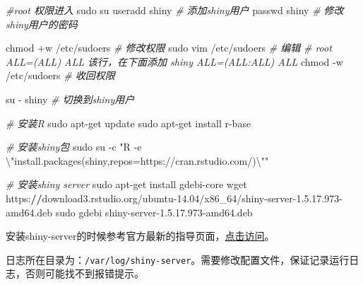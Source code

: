 \documentclass[
  10pt,
]{book}
\newenvironment{Shaded}{\begin{snugshade}}{\end{snugshade}}
\newcommand{\CommentTok}[1]{\textcolor[rgb]{0.56,0.35,0.01}{\textit{#1}}}
\newcommand{\DecValTok}[1]{\textcolor[rgb]{0.00,0.00,0.81}{#1}}
\newcommand{\ErrorTok}[1]{\textcolor[rgb]{0.64,0.00,0.00}{\textbf{#1}}}
\newcommand{\FloatTok}[1]{\textcolor[rgb]{0.00,0.00,0.81}{#1}}
\newcommand{\NormalTok}[1]{#1}
\newcommand{\SpecialCharTok}[1]{\textcolor[rgb]{0.00,0.00,0.00}{#1}}
\newcommand{\StringTok}[1]{\textcolor[rgb]{0.31,0.60,0.02}{#1}}
\begin{document}
\begin{Shaded}
\begin{Highlighting}[]
\CommentTok{\#root 权限进入}
\NormalTok{sudo su}
\NormalTok{useradd shiny }\CommentTok{\# 添加shiny用户}
\NormalTok{passwd shiny }\CommentTok{\# 修改shiny用户的密码}

\NormalTok{chmod }\SpecialCharTok{+}\NormalTok{w }\SpecialCharTok{/}\NormalTok{etc}\SpecialCharTok{/}\NormalTok{sudoers }\CommentTok{\# 修改权限}
\NormalTok{sudo vim }\SpecialCharTok{/}\NormalTok{etc}\SpecialCharTok{/}\NormalTok{sudoers }\CommentTok{\# 编辑}
\CommentTok{\# root ALL=(ALL) ALL 该行，在下面添加 shiny ALL=(ALL:ALL) ALL}
\NormalTok{chmod }\SpecialCharTok{{-}}\NormalTok{w }\SpecialCharTok{/}\NormalTok{etc}\SpecialCharTok{/}\NormalTok{sudoers }\CommentTok{\# 收回权限}

\NormalTok{su }\SpecialCharTok{{-}}\NormalTok{ shiny }\CommentTok{\# 切换到shiny用户}

\CommentTok{\# 安装R}
\NormalTok{sudo apt}\SpecialCharTok{{-}}\NormalTok{get update}
\NormalTok{sudo apt}\SpecialCharTok{{-}}\NormalTok{get install r}\SpecialCharTok{{-}}\NormalTok{base}

\CommentTok{\# 安装shiny包}
\NormalTok{sudo su }\SpecialCharTok{{-}}\NormalTok{c }\StringTok{"R {-}e }\SpecialCharTok{\textbackslash{}"}\StringTok{install.packages(\textquotesingle{}shiny\textquotesingle{},repos=\textquotesingle{}https://cran.rstudio.com/\textquotesingle{})}\SpecialCharTok{\textbackslash{}"}\StringTok{"}

\CommentTok{\# 安装shiny server}
\NormalTok{sudo apt}\SpecialCharTok{{-}}\NormalTok{get install gdebi}\SpecialCharTok{{-}}\NormalTok{core}
\NormalTok{wget https}\SpecialCharTok{:}\ErrorTok{//}\NormalTok{download3.rstudio.org}\SpecialCharTok{/}\NormalTok{ubuntu}\FloatTok{{-}14.04}\SpecialCharTok{/}\NormalTok{x86\_64}\SpecialCharTok{/}\NormalTok{shiny}\SpecialCharTok{{-}}\NormalTok{server}\DecValTok{{-}1}\NormalTok{.}\DecValTok{5}\NormalTok{.}\FloatTok{17.973}\SpecialCharTok{{-}}\NormalTok{amd64.deb}
\NormalTok{sudo gdebi shiny}\SpecialCharTok{{-}}\NormalTok{server}\DecValTok{{-}1}\NormalTok{.}\DecValTok{5}\NormalTok{.}\FloatTok{17.973}\SpecialCharTok{{-}}\NormalTok{amd64.deb}
\end{Highlighting}
\end{Shaded}

安装shiny-server的时候参考官方最新的指导页面，\href{https://www.rstudio.com/products/shiny/download-server/ubuntu/}{点击访问}。

日志所在目录为：\texttt{/var/log/shiny-server}。需要修改配置文件，保证记录运行日志，否则可能找不到报错提示。
\end{document}
